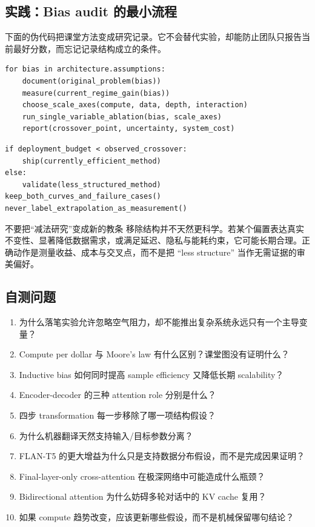 \documentclass[a4paper]{article}
\begin{document}
\subsection{实践：Bias audit 的最小流程}

下面的伪代码把课堂方法变成研究记录。它不会替代实验，却能防止团队只报告当前最好分数，而忘记记录结构成立的条件。

\begin{lstlisting}[caption={Inductive-bias audit 的研究记录模板}]
for bias in architecture.assumptions:
    document(original_problem(bias))
    measure(current_regime_gain(bias))
    choose_scale_axes(compute, data, depth, interaction)
    run_single_variable_ablation(bias, scale_axes)
    report(crossover_point, uncertainty, system_cost)
\end{lstlisting}

\begin{lstlisting}[caption={区分当前最优与长期趋势的决策伪代码}]
if deployment_budget < observed_crossover:
    ship(currently_efficient_method)
else:
    validate(less_structured_method)
keep_both_curves_and_failure_cases()
never_label_extrapolation_as_measurement()
\end{lstlisting}

\begin{warningbox}{不要把“减法研究”变成新的教条}
移除结构并不天然更科学。若某个偏置表达真实不变性、显著降低数据需求，或满足延迟、隐私与能耗约束，它可能长期合理。正确动作是测量收益、成本与交叉点，而不是把 ``less structure'' 当作无需证据的审美偏好。
\end{warningbox}

\subsection{自测问题}

\begin{enumerate}
  \item 为什么落笔实验允许忽略空气阻力，却不能推出复杂系统永远只有一个主导变量？
  \item Compute per dollar 与 Moore's law 有什么区别？课堂图没有证明什么？
  \item Inductive bias 如何同时提高 sample efficiency 又降低长期 scalability？
  \item Encoder-decoder 的三种 attention role 分别是什么？
  \item 四步 transformation 每一步移除了哪一项结构假设？
  \item 为什么机器翻译天然支持输入/目标参数分离？
  \item FLAN-T5 的更大增益为什么只是支持数据分布假设，而不是完成因果证明？
  \item Final-layer-only cross-attention 在极深网络中可能造成什么瓶颈？
  \item Bidirectional attention 为什么妨碍多轮对话中的 KV cache 复用？
  \item 如果 compute 趋势改变，应该更新哪些假设，而不是机械保留哪句结论？
\end{enumerate}
\end{document}

